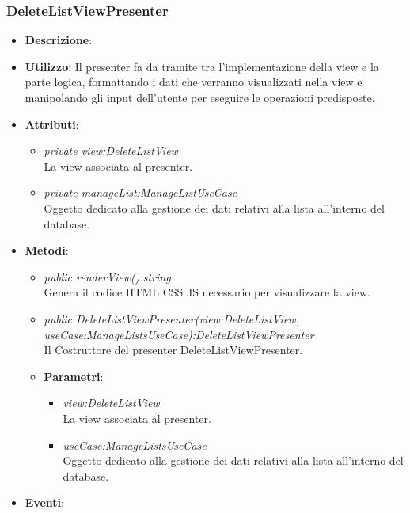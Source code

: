 \subsubsection{DeleteListViewPresenter}
\begin{itemize}
\item \textbf{Descrizione}: 
\item \textbf{Utilizzo}: Il presenter fa da tramite tra l'implementazione della view e la parte logica, formattando i dati che verranno visualizzati nella view e manipolando gli input dell'utente per eseguire le operazioni predisposte.
\item \textbf{Attributi}: 
	\begin{itemize}
	\item \textit{private view:DeleteListView}\\
		La view associata al presenter.
	\item \textit{private manageList:ManageListUseCase}\\
				Oggetto dedicato alla gestione dei dati relativi alla lista all'interno del database.
	\end{itemize}
\item \textbf{Metodi}:
	\begin{itemize}
	\item \textit{public renderView():string}\\
	Genera il codice HTML CSS JS necessario per visualizzare la view.
	\item \textit{public DeleteListViewPresenter(view:DeleteListView, useCase:ManageListsUseCase):DeleteListViewPresenter}\\
	Il Costruttore del presenter DeleteListViewPresenter.
		\item{\textbf{Parametri}: \begin{itemize}
		\item \textit{view:DeleteListView}\\
			La view associata al presenter.
		\item \textit{useCase:ManageListsUseCase}\\
			Oggetto dedicato alla gestione dei dati relativi alla lista all'interno del database.
		\end{itemize}}
	\end{itemize}
\item \textbf{Eventi}:
\end{itemize}